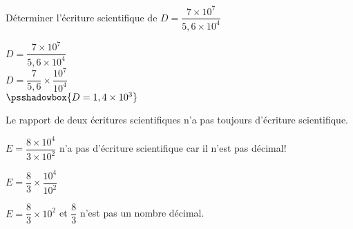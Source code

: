 \begin{methode*1}
    \exercice
    Déterminer l'écriture scientifique de $D=\dfrac{7\times 10^7}{5,6 \times 10^4}$
    \correction

    $D=\dfrac{7\times 10^7}{5,6 \times 10^4}$\\
    $D=\dfrac{7}{5,6}\times \dfrac{10^7}{10^4}$\\
    $\psshadowbox{D=1,4\times 10^3}$
\end{methode*1}

\begin{myBox}{  }
    Le rapport de deux écritures scientifiques n'a pas toujours d'écriture scientifique.

    \medskip
    {\raggedright
    $E=\dfrac{8\times 10^4}{3 \times 10^2}$ n'a pas d'écriture scientifique car il n'est pas décimal!

    \smallskip
    $E=\dfrac{8}{3}\times \dfrac{10^4}{10^2}$

    \smallskip
    $E=\dfrac{8}{3}\times 10^2$ et $\dfrac{8}{3}$ n'est pas un nombre décimal.

    }
\end{myBox}